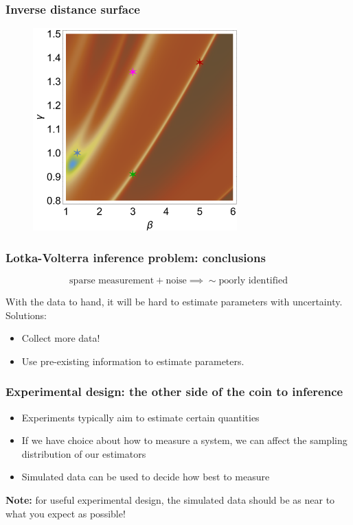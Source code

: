 \documentclass[handout]{beamer}
\begin{document}
\begin{frame}
	\frametitle{Inverse distance surface}
	
	\begin{figure}[ht]
		\centerline{\includegraphics[width=0.7\textwidth]{./figures/lotka-volterra-inference-big.png}}
	\end{figure}
	
\end{frame}

\begin{frame}
	\frametitle{Lotka-Volterra inference problem: conclusions}
	
	\begin{equation}
	\text{sparse measurement} + \text{noise} \implies \sim \text{poorly identified}
	\end{equation}
	
	With the data to hand, it will be hard to estimate parameters with uncertainty. Solutions:
	
	\begin{itemize}
		\item Collect more data!
		\item Use pre-existing information to estimate parameters.
	\end{itemize}
	
\end{frame}

\begin{frame}
	\frametitle{Experimental design: the other side of the coin to inference}
	
	\begin{itemize}
		\item Experiments typically aim to estimate certain quantities
		\item If we have choice about how to measure a system, we can affect the sampling distribution of our estimators
		\item Simulated data can be used to decide how best to measure
	\end{itemize}
	
	\textbf{Note:} for useful experimental design, the simulated data should be as near to what you expect as possible!
	
\end{frame}
\end{document}
